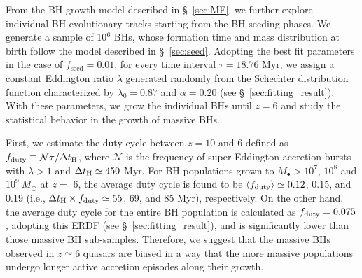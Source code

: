 \documentclass[twocolumn, twocolappendix]{aastex63}
\newcommand{\Msun}{M_\odot}
\newcommand{\tlife}{\tau}
\newcommand{\fseed}{f_\mathrm{seed}}
\newcommand{\blue}[1]{\textcolor{blue}{ #1}}
\begin{document}
\begin{CJK*}{UTF8}{gbsn}
From the BH growth model described in \S~\ref{sec:MF}, we further explore individual BH evolutionary tracks starting from the BH seeding phases.
We generate a sample of 10$^6$ BHs, whose formation time and mass distribution at birth follow the model described in \S~\ref{sec:seed}. 
Adopting the best fit parameters in the case of $\fseed = 0.01$,
for every time interval $\tlife=18.76$ Myr,
we assign a constant Eddington ratio $\lambda$ generated randomly from the Schechter distribution function 
characterized by $\lambda_0=0.87$ and $\alpha=0.20$ (see \S~\ref{sec:fitting_result}).
With these parameters, we grow the individual BHs until $z=6$ and 
study the statistical behavior in the growth of massive BHs.

First, we estimate the duty cycle between $z=10$ and $6$ defined as $f_{\rm duty} \equiv \mathcal{N}\tlife/\Delta t_{\rm H}$, 
where $\mathcal{N}$ is the frequency of super-Eddington accretion bursts with $\lambda>1$ and $\Delta t_{\rm H}\simeq 450$ Myr.
For BH populations grown to $M_\bullet>10^7$, $10^8$ and $10^9~\Msun$ at $z=$ 6,
the average duty cycle is found to be $\langle f_{\rm duty}\rangle \simeq 0.12$, 0.15, and 0.19
(i.e., $\Delta t_{\rm H} \times f_{\rm duty} \simeq 55$, 69, and 85 Myr), respectively.
On the other hand, the average duty cycle for the entire BH population is calculated as $f_{\rm duty}= 0.075$,
adopting this ERDF (see \S~\ref{sec:fitting_result}), and is significantly lower than those massive BH sub-samples.
Therefore, we suggest that the massive BHs observed in $z\simeq 6$ quasars are biased in a way that
the more massive populations undergo longer active accretion episodes along their growth.



\end{CJK*}
\end{document}
